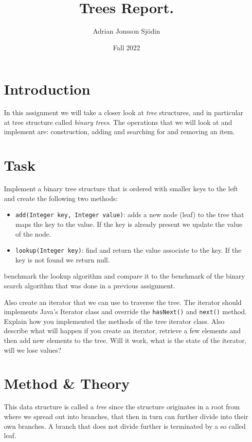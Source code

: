 \documentclass[a4paper,11pt]{article}
\begin{document}
\title{
    \textbf{Trees Report.}
}
\author{Adrian Jonsson Sjödin}
\date{Fall 2022}

\maketitle

\section{Introduction}
In this assignment we will take a closer look at \textit{tree} structures, and in
particular at tree structure called \textit{binary trees}. The operations that we will look at and
implement are: construction, adding and searching for and removing an item.

\section{Task}
Implement a binary tree structure that is ordered with smaller keys to the left and create the
following two methods:
\begin{itemize}
    \item {\tt add(Integer key, Integer value)}: adds a new node (leaf) to the
          tree that maps the key to the value. If the key is already present we
          update the value of the node.
    \item {\tt lookup(Integer key)}: find and return the value associate to the
          key. If the key is not found we return null.
\end{itemize}
benchmark the lookup algorithm and compare it to the benchmark of the binary search algorithm that
was done in a previous assignment.

Also create an iterator that we can use to traverse the tree. The iterator should implements Java's
Iterator class and override the {\tt hasNext()} and {\tt next()} method. Explain how you implemented
the methods of the tree iterator class. Also describe what will happen if you create an iterator,
retrieve a few elements and then add new elements to the tree. Will it work, what is the state of the
iterator, will we lose values?

\section{Method \& Theory}
This data structure is called a \textit{tree} since the structure originates in a root from where we
spread out into branches, that then in turn can further divide into their own branches. A branch that
does not divide further is terminated by a so called leaf.
\end{document}
